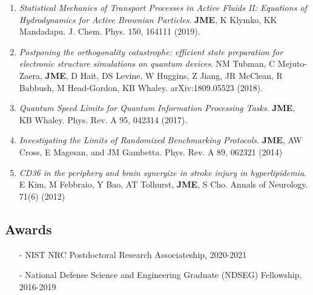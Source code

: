 \documentclass[]{article}
\begin{document}
\begin{enumerate}
\item  \textit{Statistical Mechanics of Transport Processes in Active Fluids II: Equations of Hydrodynamics for Active Brownian Particles}. \textbf{JME}, K Klymko, KK Mandadapu. J. Chem. Phys. 150, 164111 (2019).

\item \textit{Postponing the orthogonality catastrophe: efficient state preparation for electronic structure simulations on quantum devices}. NM Tubman, C Mejuto-Zaera, \textbf{JME}, D Hait, DS Levine, W Huggins, Z Jiang, JR McClean, R Babbush, M Head-Gordon, KB Whaley.	arXiv:1809.05523 (2018).



\item \textit{Quantum Speed Limits for Quantum Information Processing Tasks}. \textbf{JME}, KB Whaley. Phys. Rev. A 95, 042314 (2017).

\item \textit{Investigating the Limits of Randomized Benchmarking Protocols}. \textbf{JME}, AW Cross, E Magesan, and JM Gambetta. 
Phys. Rev. A 89, 062321 (2014) 

\item \textit{CD36 in the periphery and brain
	synergize in stroke injury in hyperlipidemia}. E Kim, M Febbraio, Y Bao, AT Tolhurst, \textbf{JME}, S Cho.  Annals of Neurology. 71(6) (2012)
\end{enumerate}


\subsection*{Awards}
\begin{itemize}
	\item[-] NIST NRC Postdoctoral Research Associateship, 2020-2021
	\item[-] National Defense Science and Engineering Graduate (NDSEG) Fellowship, 2016-2019
\end{itemize}
\end{document}
